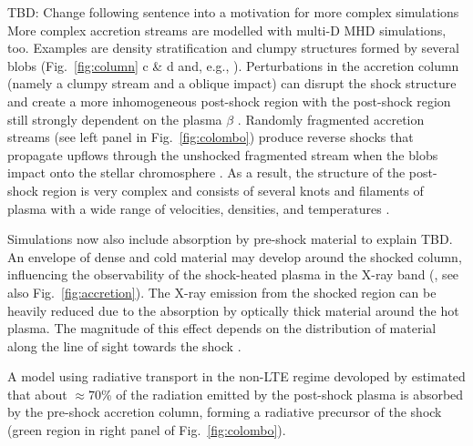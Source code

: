\documentclass[graybox, nosecnum]{svmult}
\begin{document}
{\color{red} TBD: Change following sentence into a motivation for more complex simulations}
More complex accretion streams are modelled with multi-D MHD simulations, too. Examples are density stratification and clumpy structures formed by several blobs (Fig.~\ref{fig:column} c \& d and, e.g., \cite{Matsakos_2013,Colombo_2016}). Perturbations in the accretion column (namely a clumpy stream and a oblique impact) can disrupt the shock structure and create a more inhomogeneous post-shock region with the post-shock region still strongly dependent on the plasma $\beta$ \cite{Matsakos_2013}.
Randomly fragmented accretion streams (see left panel in Fig.~\ref{fig:colombo}) produce reverse shocks that propagate upflows through the unshocked fragmented stream when the blobs impact onto the stellar chromosphere \cite{Colombo_2016}.
As a result, the structure of the post-shock region is very complex and consists of several knots and filaments of plasma with a wide range of velocities, densities, and temperatures \cite{Colombo_2016}.

Simulations now also include absorption by pre-shock material {\color{red} to explain TBD}. An envelope of dense and cold material may develop around the shocked column, influencing the observability of the shock-heated plasma in the X-ray band (\citep{Orlando_2013}, see also Fig.~\ref{fig:accretion}). The X-ray emission from the shocked region can be heavily reduced due to the absorption by  optically thick material around the hot plasma. The magnitude of this effect depends on the distribution of material along the line of sight towards the shock \cite{Bonito_2014}.

A model using radiative transport in the non-LTE regime devoloped by \cite{Colombo_2019b} estimated that about $\approx 70$\% of the radiation emitted by the post-shock plasma is absorbed by the pre-shock accretion column, forming a radiative precursor of the shock (green region in right panel of Fig.~\ref{fig:colombo}).
\end{document}
